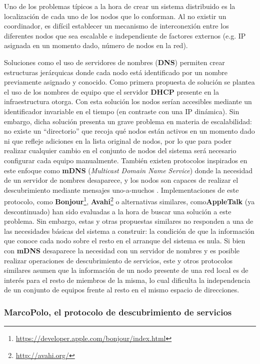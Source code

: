 Uno de los problemas típicos a la hora de crear un sistema distribuido es la localización de cada uno de los nodos que lo conforman. Al no existir un coordinador, es difícil establecer un mecanismo de interconexión entre los diferentes nodos que sea escalable e independiente de factores externos (e.g. IP asignada en un momento dado, número de nodos en la red).

Soluciones como el uso de servidores de nombres (\textbf{DNS}) permiten crear estructuras jerárquicas donde cada nodo está identificado por un nombre previamente asignado y conocido. Como primera propuesta de solución se plantea el uso de los nombres de equipo que el servidor \textbf{DHCP} presente en la infraestructura otorga. Con esta solución los nodos serían accesibles mediante un identificador invariable en el tiempo (en contraste con una IP dinámica). Sin embargo, dicha solución presenta un grave problema en materia de escalabilidad: no existe un ``directorio'' que recoja qué nodos están activos en un momento dado ni que refleje adiciones en la lista original de nodos, por lo que para poder realizar cualquier cambio en el conjunto de nodos del sistema será necesario configurar cada equipo manualmente. También existen protocolos inspirados en este enfoque como \textbf{mDNS} (\textit{Multicast Domain Name Service}) donde la necesidad de un servidor de nombres desaparece, y los nodos son capaces de realizar el descubrimiento mediante mensajes uno-a-muchos \cite{rfc6762}. Implementaciones de este protocolo, como \textbf{Bonjour}\footnote{\href{https://developer.apple.com/bonjour/index.html}{https://developer.apple.com/bonjour/index.html}}, \textbf{Avahi}\footnote{\href{http://avahi.org/}{http://avahi.org/}} o alternativas similares, como\textbf{AppleTalk} (ya descontinuado) han sido evaluadas a la hora de buscar una solución a este problema. Sin embargo, estas y otras propuestas similares no responden a una de las necesidades básicas del sistema a construir: la condición de que la información que conoce cada nodo sobre el resto en el arranque del sistema es nula. Si bien con \textbf{mDNS} desaparece la necesidad con un servidor de nombres y es posible realizar operaciones de descubrimiento de servicios, este y otros protocolos similares asumen que la información de un nodo presente de una red local es de interés para el resto de miembros de la misma, lo cual dificulta la independencia de un conjunto de equipos frente al resto en el mismo espacio de direcciones.

\subsubsection{MarcoPolo, el protocolo de descubrimiento de servicios}
\label{marcopolo}

